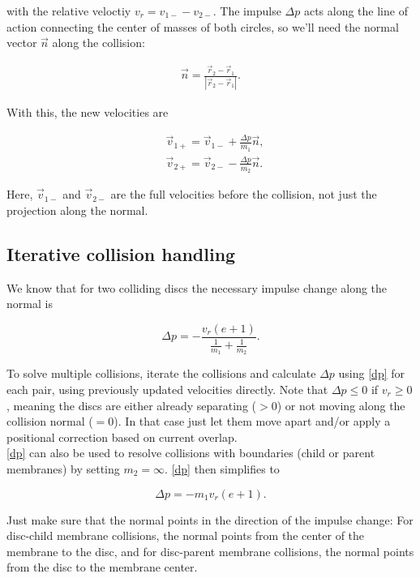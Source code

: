 \documentclass{article}
\begin{document}
	with the relative veloctiy $v_r = v_{1-} - v_{2-}$. The impulse $\Delta p$ acts along the line of action connecting the center of masses of both circles, so we'll need the normal vector $\vec{n}$ along the collision:
	
	\begin{align*}
		\vec{n} = \frac{\vec{r}_2 - \vec{r}_1}{|\vec{r}_2 - \vec{r}_1|}.
	\end{align*}

	With this, the new velocities are
	
	\begin{align*}
		&\vec{v}_{1+} = \vec{v}_{1-} + \frac{\Delta p}{m_1}\vec{n},\\
		&\vec{v}_{2+} = \vec{v}_{2-} - \frac{\Delta p}{m_2}\vec{n}.
	\end{align*}

	Here, $\vec{v}_{1-}$ and $\vec{v}_{2-}$ are the full velocities before the collision, not just the projection along the normal.

    \subsection{Iterative collision handling}
    We know that for two colliding discs the necessary impulse change along the normal is 

    \begin{equation}
        \label{dp}
        \Delta p = -\frac{v_r(e + 1)}{\frac{1}{m_1} + \frac{1}{m_2}}.
    \end{equation}

    To solve multiple collisions, iterate the collisions and calculate $\Delta p$ using \cref{dp} for each pair, using previously updated velocities directly. Note that $\Delta p \le 0$ if $v_r \ge 0$, meaning the discs are either already separating ($> 0$) or not moving along the collision normal ($= 0$). In that case just let them move apart and/or apply a positional correction based on current overlap. \\

    \cref{dp} can also be used to resolve collisions with boundaries (child or parent membranes) by setting $m_2 = \infty$. \cref{dp} then simplifies to 

    \begin{equation*}
        \Delta p = -m_1v_r(e + 1).
    \end{equation*}

    Just make sure that the normal points in the direction of the impulse change: For disc-child membrane collisions, the normal points from the center of the membrane to the disc, and for disc-parent membrane collisions, the normal points from the disc to the membrane center.
\end{document}
